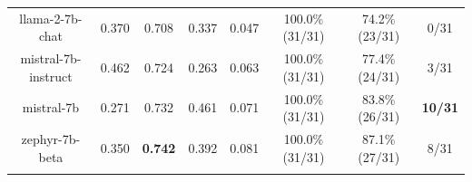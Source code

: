 \begin{table}[ht]
{\begin{tabular}{cccccccc}
llama-2-7b-chat      & 0.370                & 0.708                & 0.337                                                                   & 0.047                                                                               & 100.0\% (31/31)                                                                     & 74.2\% (23/31)                                                                     & 0/31                                                                        \\
mistral-7b-instruct  & 0.462                & 0.724                & 0.263                                                                   & 0.063                                                                               & 100.0\% (31/31)                                                                     & 77.4\% (24/31)                                                                     & 3/31                                                                        \\
mistral-7b           & 0.271                & 0.732                & 0.461                                                                   & 0.071                                                                               & 100.0\% (31/31)                                                                     & 83.8\% (26/31)                                                                     & \textbf{10/31}                                                              \\
zephyr-7b-beta       & 0.350                & \textbf{0.742}       & 0.392                                                                   & 0.081                                                                               & 100.0\% (31/31)                                                                     & 87.1\% (27/31)                                                                     & 8/31                                                                        \\
\multicolumn{1}{l}{} & \multicolumn{1}{l}{} & \multicolumn{1}{l}{} & \multicolumn{1}{l}{}                                                    & \multicolumn{1}{l}{}                                                                & \multicolumn{1}{l}{}                                                                & \multicolumn{1}{l}{}                                                               & \multicolumn{1}{l}{}                                                        \\
\midrule

\end{tabular}}
\end{table}
